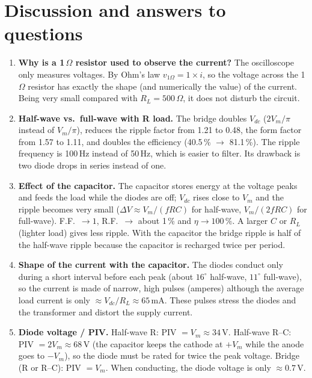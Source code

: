 \documentclass[11pt,a4paper]{article}
\begin{document}
\section{Discussion and answers to questions}
\begin{enumerate}[leftmargin=*]
\item \textbf{Why is a 1\,$\Omega$ resistor used to observe the current?}
The oscilloscope only measures voltages. By Ohm's law $v_{1\Omega}=1\times i$,
so the voltage across the 1\,$\Omega$ resistor has exactly the shape (and numerically
the value) of the current. Being very small compared with $R_L=500\,\Omega$, it does not
disturb the circuit.

\item \textbf{Half-wave vs.\ full-wave with R load.}
The bridge doubles $V_{dc}$ ($2V_m/\pi$ instead of $V_m/\pi$), reduces the ripple
factor from 1.21 to 0.48, the form factor from 1.57 to 1.11, and doubles the efficiency
(40.5\,\% $\to$ 81.1\,\%). The ripple frequency is 100\,Hz instead of 50\,Hz, which is
easier to filter. Its drawback is two diode drops in series instead of one.

\item \textbf{Effect of the capacitor.}
The capacitor stores energy at the voltage peaks and feeds the load while the diodes
are off; $V_{dc}$ rises close to $V_m$ and the ripple becomes very small
($\Delta V\approx V_m/(fRC)$ for half-wave, $V_m/(2fRC)$ for full-wave).
F.F.\ $\to1$, R.F.\ $\to$ about 1\,\% and $\eta\to100\,\%$. A larger $C$ or $R_L$
(lighter load) gives less ripple. With the capacitor the bridge ripple is half of the
half-wave ripple because the capacitor is recharged twice per period.

\item \textbf{Shape of the current with the capacitor.}
The diodes conduct only during a short interval before each peak (about $16^\circ$
half-wave, $11^\circ$ full-wave), so the current is made of narrow, high pulses
(amperes) although the average load current is only $\approx V_{dc}/R_L\approx65$\,mA.
These pulses stress the diodes and the transformer and distort the supply current.

\item \textbf{Diode voltage / PIV.}
Half-wave R: PIV $=V_m\approx34$\,V. Half-wave R--C: PIV $=2V_m\approx68$\,V
(the capacitor keeps the cathode at $+V_m$ while the anode goes to $-V_m$), so the
diode must be rated for twice the peak voltage. Bridge (R or R--C): PIV $=V_m$.
When conducting, the diode voltage is only $\approx0.7$\,V.


\end{enumerate}
\end{document}
